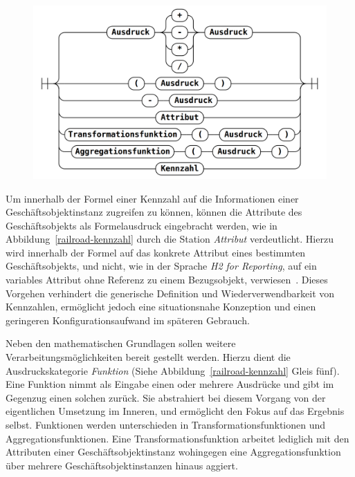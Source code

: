 \documentclass[
  language=german, %
  type=bachelor%
]{isthesis}
\begin{document}
\begin{content}
  \begin{figure}[caption={Ausdruck Syntaxdiagramm \protect\footnotemark}, label={railroad-kennzahl}]
    \includegraphics[scale=0.25]{content/figures/railroad-kennzahl.png}
  \end{figure}

  Um innerhalb der Formel einer Kennzahl auf die Informationen einer
  Geschäftsobjektinstanz zugreifen zu können, können die Attribute des
  Geschäftsobjekts als Formelausdruck eingebracht werden, wie in
  Abbildung~\ref{railroad-kennzahl} durch die Station \textit{Attribut}
  verdeutlicht. Hierzu wird innerhalb der Formel auf das konkrete Attribut
  eines bestimmten Geschäftsobjekts, und nicht, wie in der Sprache \textit{H2
  for Reporting}, auf ein variables Attribut ohne Referenz zu einem
  Bezugsobjekt, verwiesen~\cite[][S.  20]{becker2007h2}. Dieses Vorgehen
  verhindert die generische Definition und Wiederverwendbarkeit von Kennzahlen,
  ermöglicht jedoch eine situationsnahe Konzeption und einen geringeren
  Konfigurationsaufwand im späteren Gebrauch.

  Neben den mathematischen Grundlagen sollen weitere Verarbeitungsmöglichkeiten
  bereit gestellt werden. Hierzu dient die Ausdruckskategorie \textit{Funktion}
  (Siehe Abbildung~\ref{railroad-kennzahl} Gleis fünf). Eine Funktion nimmt als
  Eingabe einen oder mehrere Ausdrücke und gibt im Gegenzug einen solchen
  zurück. Sie abstrahiert bei diesem Vorgang von der eigentlichen Umsetzung im
  Inneren, und ermöglicht den Fokus auf das Ergebnis selbst. Funktionen werden
  unterschieden in Transformationsfunktionen und Aggregationsfunktionen. Eine
  Transformationsfunktion arbeitet lediglich mit den Attributen einer
  Geschäftsobjektinstanz wohingegen eine Aggregationsfunktion über mehrere
  Geschäftsobjektinstanzen hinaus aggiert.
  

\end{content}
\end{document}
